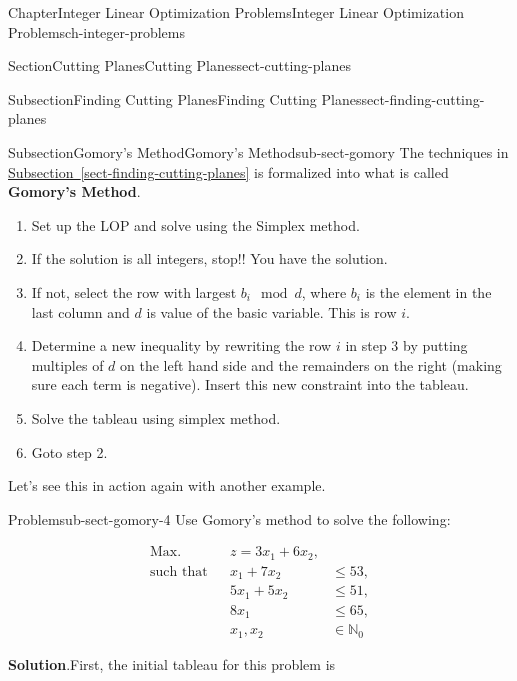 \documentclass[oneside,10pt,]{book}
\newcommand{\blocktitlefont}{\relax}
\newcommand{\xreffont}{\relax}
\newcommand{\terminology}[1]{\textbf{#1}}
\numberwithin{equation}{section}
\newcommand{\amp}{&}
\begin{document}
\begin{chapterptx}{Chapter}{Integer Linear Optimization Problems}{}{Integer Linear Optimization Problems}{}{}{ch-integer-problems}
\begin{sectionptx}{Section}{Cutting Planes}{}{Cutting Planes}{}{}{sect-cutting-planes}
\begin{subsectionptx}{Subsection}{Finding Cutting Planes}{}{Finding Cutting Planes}{}{}{sect-finding-cutting-planes}
\end{subsectionptx}
%
%
\typeout{************************************************}
\typeout{************************************************}
%
\begin{subsectionptx}{Subsection}{Gomory's Method}{}{Gomory's Method}{}{}{sub-sect-gomory}
The techniques in \hyperref[sect-finding-cutting-planes]{Subsection~{\xreffont\ref{sect-finding-cutting-planes}}} is formalized into what is called \terminology{Gomory's Method}.%
\begin{enumerate}
\item{}Set up the LOP and solve using the Simplex method.%
\item{}If the solution is all integers, stop!! You have the solution.%
\item{}If not, select the row with largest \(b_{i} \mod d\), where \(b_{i}\) is the element in the last column and \(d\) is value of the basic variable.  This is row \(i\).%
\item{}Determine a new inequality by rewriting the row \(i\) in step 3 by putting multiples of \(d\) on the left hand side and the remainders on the right (making sure each term is negative). Insert this new constraint into the tableau.%
\item{}Solve the tableau using simplex method.%
\item{}Goto step 2.%
\end{enumerate}
%
\par
Let's see this in action again with another example.%
\begin{problem}{Problem}{}{sub-sect-gomory-4}%
Use Gomory's method to solve the following:%
\par
%
\begin{equation*}
\begin{aligned} \text{Max.} \amp\amp z  = 3x_1 +6x_2, \amp \\ \text{such that} \amp\amp x_1 + 7 x_2 \amp \leq 53, \\ \amp\amp 5 x_1 + 5 x_2 \amp \leq 51, \\ \amp\amp 8 x_1 \amp \leq 65, \\ \amp\amp x_1, x_2 \amp \in \mathbb{N}_0 \end{aligned}
\end{equation*}
%
\par\smallskip%
\noindent\textbf{\blocktitlefont Solution}.\hypertarget{sub-sect-gomory-4-2}{}\quad{}First, the initial tableau for this problem is%
\par

\end{problem}
\end{subsectionptx}
\end{sectionptx}
\end{chapterptx}
\end{document}
